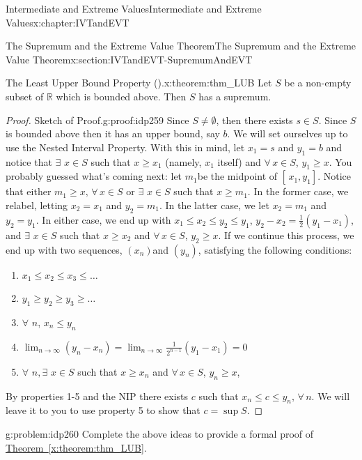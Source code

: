 \begin{chapterptx}{Intermediate and Extreme Values}{}{Intermediate and Extreme Values}{}{}{x:chapter:IVTandEVT}
\begin{sectionptx}{The Supremum and the Extreme Value Theorem}{}{The Supremum and the Extreme Value Theorem}{}{}{x:section:IVTandEVT-SupremumAndEVT}
\begin{theorem}{The Least Upper Bound Property ().}{}{x:theorem:thm_LUB}
			Let \(S\) be a non-empty subset of \(\mathbb{R}\) which is bounded above. Then \(S\) has a supremum.%
		\end{theorem}
		\begin{proof}{Sketch of Proof.}{g:proof:idp259}
			Since \(S\neq\emptyset\), then there exists \(s\in S\). Since \(S\) is bounded above then it has an upper bound, say \(b\). We will set ourselves up to use the Nested Interval Property. With this in mind, let \(x_1=s\) and \(y_1=b\) and notice that \(\exists\) \(x\in S\) such that \(x\geq x_1\) (namely, \(x_1\) itself) and \(\forall\,x\in S\), \(y_1\geq x\). You probably guessed what's coming next: let \(m_1\)be the midpoint of \([\,x_1,y_1]\). Notice that either \(m_1\geq x,\,\forall\,x\in S\) or \(\exists\) \(x\in S\) such that \(x\geq m_1\). In the former case, we relabel, letting \(x_2=x_1\) and \(y_2=m_1\). In the latter case, we let \(x_2=m_1\) and \(y_2=y_1\). In either case, we end up with \(x_1\leq x_2\leq y_2\leq y_1\), \(y_2-x_2=\frac{1}{2}\left(y_1-x_1\right)\), and \(\exists\) \(x\in S\) such that \(x\geq x_2\) and \(\forall\,x\in S\), \(y_2\geq x\). If we continue this process, we end up with two sequences, \(\left(x_n\right)\)and \(\left(y_n\right)\), satisfying the following conditions:%
			\begin{enumerate}
				\item{}\(\displaystyle x_1\leq x_2\leq x_3\leq\ldots\)%
				\item{}\(\displaystyle y_1\geq y_2\geq y_3\geq\ldots\)%
				\item{}\(\forall\) \(n\), \(x_n\leq y_n\)%
				\item{}\(\displaystyle \lim_{n\rightarrow\infty}\left(y_n-x_n\right)=\lim_{n\rightarrow\infty} \frac{1}{2^{n-1}}\left(y_1-x_1\right)=0\)%
				\item{}\(\forall\) \(n,\exists\) \(x\in S\) such that \(x\geq x_n\) and \(\forall\,x\in S\), \(y_n\geq x\),%
			\end{enumerate}
			\par
			By properties 1-5 and the NIP there exists \(c\) such that \(x_n\leq c\leq y_n,\,\forall\,n\). We will leave it to you to use property 5 to show that \(c=\sup S\).%
		\end{proof}
		\begin{problem}{}{g:problem:idp260}%
			 Complete the above ideas to provide a formal proof of \hyperref[x:theorem:thm_LUB]{Theorem~{\xreffont\ref{x:theorem:thm_LUB}}}.%

\end{problem}
\end{sectionptx}
\end{chapterptx}
